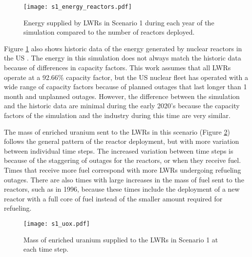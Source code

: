 \begin{figure}[h!]
    \centering
    \texttt{[image: s1\_energy\_reactors.pdf]}
    \caption{Energy supplied by \glspl{LWR} in Scenario 1 during each year of
    the simulation compared to the number of reactors deployed.}
    \label{fig:energy_reactor1}
\end{figure}

Figure \ref{fig:energy_reactor1} also shows historic data of the 
energy generated by nuclear reactors in the US \cite{noauthor_total_2022}.
The energy in this simulation does not always match the historic data 
because of differences in capacity factors. This work assumes that all 
\glspl{LWR} operate at a 92.66\% capacity factor, but the US nuclear fleet
has operated with a wide range of capacity factors because of planned outages 
that last longer than 1 month and unplanned outages. However, 
the difference between the simulation and the historic data are minimal 
during the early 2020's because the capacity factors of the simulation 
and the industry during this time are very similar. 

The mass of enriched uranium sent to the \glspl{LWR} in this scenario (Figure 
\ref{fig:fuel1}) follows the general pattern of the reactor deployment, but with 
more variation between individual time steps. The increased variation between 
time steps is because of the staggering of outages for the reactors, or when 
they receive fuel. Times that receive more fuel correspond with more 
\glspl{LWR} undergoing refueling outages. There are also times with large 
increases in the mass of fuel 
sent to the reactors, such as in 1996, because these times include the deployment 
of a new reactor with a full core of fuel instead of the smaller amount 
required for refueling.

\begin{figure}[h!]
    \centering
    \texttt{[image: s1\_uox.pdf]}
    \caption{Mass of enriched uranium supplied to the LWRs in Scenario 1 at each time step.}
    \label{fig:fuel1}
\end{figure}

